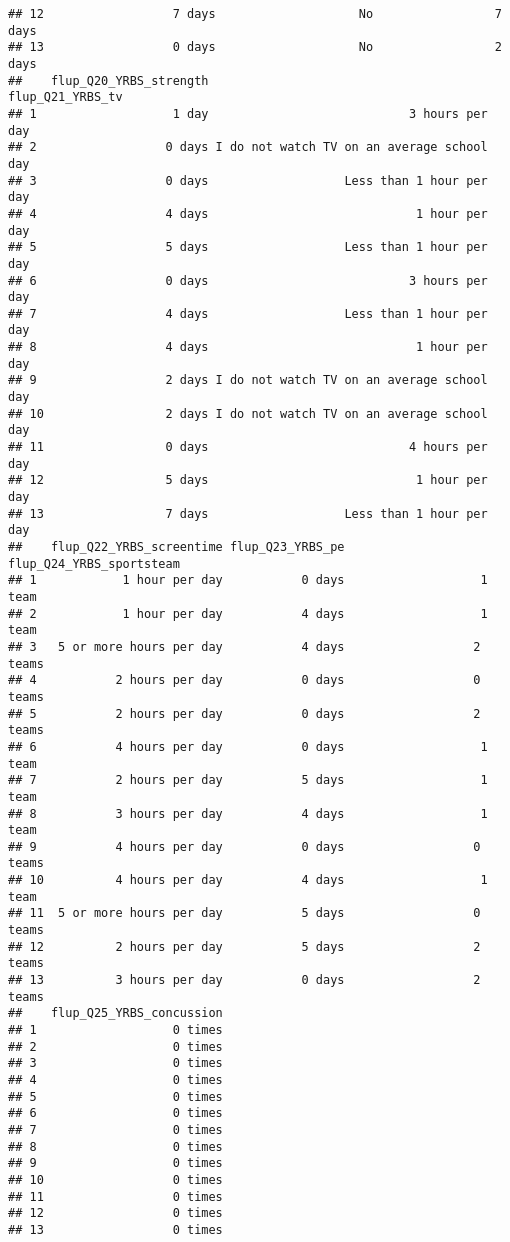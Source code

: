 \documentclass[]{article}
\begin{document}
\begin{verbatim}
## 12                  7 days                    No                 7 days
## 13                  0 days                    No                 2 days
##    flup_Q20_YRBS_strength                           flup_Q21_YRBS_tv
## 1                   1 day                            3 hours per day
## 2                  0 days I do not watch TV on an average school day
## 3                  0 days                   Less than 1 hour per day
## 4                  4 days                             1 hour per day
## 5                  5 days                   Less than 1 hour per day
## 6                  0 days                            3 hours per day
## 7                  4 days                   Less than 1 hour per day
## 8                  4 days                             1 hour per day
## 9                  2 days I do not watch TV on an average school day
## 10                 2 days I do not watch TV on an average school day
## 11                 0 days                            4 hours per day
## 12                 5 days                             1 hour per day
## 13                 7 days                   Less than 1 hour per day
##    flup_Q22_YRBS_screentime flup_Q23_YRBS_pe flup_Q24_YRBS_sportsteam
## 1            1 hour per day           0 days                   1 team
## 2            1 hour per day           4 days                   1 team
## 3   5 or more hours per day           4 days                  2 teams
## 4           2 hours per day           0 days                  0 teams
## 5           2 hours per day           0 days                  2 teams
## 6           4 hours per day           0 days                   1 team
## 7           2 hours per day           5 days                   1 team
## 8           3 hours per day           4 days                   1 team
## 9           4 hours per day           0 days                  0 teams
## 10          4 hours per day           4 days                   1 team
## 11  5 or more hours per day           5 days                  0 teams
## 12          2 hours per day           5 days                  2 teams
## 13          3 hours per day           0 days                  2 teams
##    flup_Q25_YRBS_concussion
## 1                   0 times
## 2                   0 times
## 3                   0 times
## 4                   0 times
## 5                   0 times
## 6                   0 times
## 7                   0 times
## 8                   0 times
## 9                   0 times
## 10                  0 times
## 11                  0 times
## 12                  0 times
## 13                  0 times
\end{verbatim}
\end{document}
